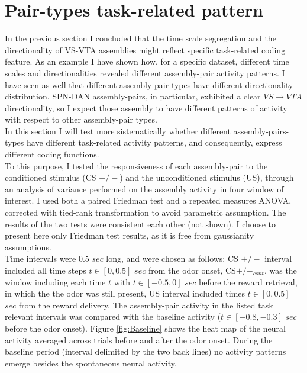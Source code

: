  \section{Pair-types task-related pattern}
 \label{sec:TaskResp}
In the previous section I concluded that the time scale segregation and the directionality of VS-VTA assemblies might reflect specific task-related coding feature. As an example I have shown how, for a specific dataset, different time scales and directionalities revealed different assembly-pair activity patterns. I have seen as well that different assembly-pair types have different directionality distribution. SPN-DAN assembly-pairs, in particular, exhibited a clear $VS\rightarrow VTA$ directionality, so I expect those assembly to have different patterns of activity with respect to other assembly-pair types.\\In this section I will test more sistematically whether different assembly-pairs-types have different task-related activity patterns, and consequently, express different coding functions.\\
To this purpose, I tested the responsiveness of each assembly-pair to the conditioned stimulus (CS $+/-$) and the unconditioned stimulus (US), through an analysis of variance performed on the assembly activity in four window of interest. I used both a paired Friedman test and a repeated measures ANOVA, corrected with tied-rank transformation to avoid parametric assumption. The results of the two tests were consistent each other (not shown). I choose to present here only Friedman test results, as it is free from gaussianity assumptions.\\Time intervals were 0.5 $sec$ long, and were chosen as follows: CS $+/-$ interval included all time steps $t \in [0, 0.5]$ $sec$ from the odor onset, CS$+/-_{cont}$. was the window including each time $t$ with $t \in [-0.5, 0]$ $sec$ before the reward retrieval, in which the the odor was still present, US interval included times $t \in [0,0.5]$ $sec$ from the reward delivery. The assembly-pair activity in the listed task relevant intervals was compared with the baseline activity ($t \in [-0.8, -0.3]$ $sec$ before the odor onset). Figure \ref{fig:Baseline} shows the heat map of the neural activity averaged across trials before and after the odor onset. During the baseline period (interval delimited by the two back lines) no activity patterns emerge besides the spontaneous neural activity.
